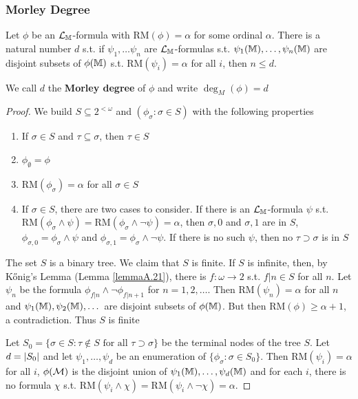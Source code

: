\documentclass[11pt]{article}
\def \RM {\text{RM}}
\begin{document}
\subsubsection{Morley Degree}
\label{sec:org493dbc1}
\begin{proposition}[]
Let \(\phi\) be an \(\mathcal{L}_{\mathbb{M}}\)-formula with \(\RM(\phi)=\alpha\) for some ordinal \(\alpha\). There is a natural
number \(d\) s.t. if \(\psi_1,\dots\psi_n\) are \(\mathcal{L}_{\mathbb{M}}\)-formulas s.t. \(\psi_1(\mathbb{M}),\dots,\psi_n(\mathbb{M})\) are disjoint
subsets of \(\phi(\mathbb{M})\) s.t. \(\RM(\psi_i)=\alpha\) for all \(i\), then \(n\le d\).

We call \(d\) the \textbf{Morley degree} of \(\phi\) and write \(\deg_M(\phi)=d\)
\end{proposition}

\begin{proof}
We build \(S\subseteq 2^{<\omega}\) and \((\phi_\sigma:\sigma\in S)\) with the following properties
\begin{enumerate}
\item If \(\sigma\in S\) and \(\tau\subseteq\sigma\), then \(\tau\in S\)
\item \(\phi_\emptyset=\phi\)
\item \(\RM(\phi_\sigma)=\alpha\) for all \(\sigma\in S\)
\item If \(\sigma\in S\), there are two cases to consider. If there is an \(\mathcal{L}_{\mathbb{M}}\)-formula \(\psi\)
s.t. \(\RM(\phi_\sigma\wedge\psi)=\RM(\phi_\sigma\wedge\neg\psi)=\alpha\), then \(\sigma,0\) and \(\sigma,1\) are in \(S\), \(\phi_{\sigma,0}=\phi_\sigma\wedge\psi\)
and \(\phi_{\sigma,1}=\phi_\sigma\wedge\neg\psi\). If there is no such \(\psi\), then no \(\tau\supset\sigma\) is in \(S\)
\end{enumerate}


The set \(S\) is a binary tree. We claim that \(S\) is finite. If \(S\) is infinite, then, by
Kőnig's Lemma (Lemma \ref{lemmaA.21}), there is \(f:\omega\to 2\) s.t. \(f|n\in S\) for all \(n\).
Let \(\psi_n\) be the formula \(\phi_{f|n}\wedge\neg\phi_{f|n+1}\) for \(n=1,2,\dots\). Then \(\RM(\psi_n)=\alpha\) for
all \(n\)
and \(\psi_1(\mathbb{M}),\psi_2(\mathbb{M}),\dots\) are disjoint subsets of \(\phi(\mathbb{M})\). But then \(\RM(\phi)\ge\alpha+1\), a
contradiction. Thus \(S\) is finite

Let \(S_0=\{\sigma\in S:\tau\notin S\text{ for all }\tau\supset\sigma\}\) be the terminal nodes of the tree \(S\).
Let \(d=\abs{S_0}\) and let \(\psi_1,\dots,\psi_d\) be an enumeration of \(\{\phi_\sigma:\sigma\in S_0\}\).
Then \(\RM(\psi_i)=\alpha\) for all \(i\), \(\phi(\mathcal{M})\) is the disjoint union of \(\psi_1(\mathbb{M}),\dots,\psi_d(\mathbb{M})\) and for
each \(i\), there is no formula \(\chi\) s.t. \(\RM(\psi_i\wedge\chi)=\RM(\psi_i\wedge\neg\chi)=\alpha\).


\end{proof}
\end{document}
